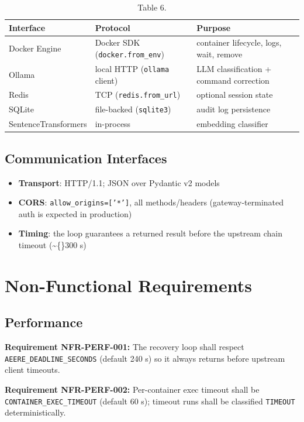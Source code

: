 \documentclass[10pt,journal,onecolumn]{IEEEtran}
\newcommand{\reqid}[1]{\textbf{#1}}
\begin{document}
\begin{table}[h]
\caption{Table 6.}
\label{tab:t6}
\begin{tabularx}{\columnwidth}{l >{\raggedright\arraybackslash}X >{\raggedright\arraybackslash}X}
\toprule
\textbf{Interface} & \textbf{Protocol} & \textbf{Purpose}\\
\midrule
Docker Engine & Docker SDK (\texttt{docker.from\_env}) & container lifecycle, logs, wait, remove\\
Ollama & local HTTP (\texttt{ollama} client) & LLM classification + command correction\\
Redis & TCP (\texttt{redis.from\_url}) & optional session state\\
SQLite & file-backed (\texttt{sqlite3}) & audit log persistence\\
SentenceTransformers & in-process & embedding classifier\\
\bottomrule
\end{tabularx}
\end{table}

\subsection{Communication Interfaces}

\begin{itemize}
\item \textbf{Transport}: HTTP/1.1; JSON over Pydantic v2 models
\item \textbf{CORS}: \texttt{allow\_origins=['*']}, all methods/headers (gateway-terminated auth is expected in production)
\item \textbf{Timing}: the loop guarantees a returned result before the upstream chain timeout (\textasciitilde\{\}300 s)
\end{itemize}

\section{Non-Functional Requirements}

\subsection{Performance}

\reqid{Requirement NFR-PERF-001:} The recovery loop shall respect \texttt{AEERE\_DEADLINE\_SECONDS} (default 240 s) so it always returns before upstream client timeouts.

\reqid{Requirement NFR-PERF-002:} Per-container exec timeout shall be \texttt{CONTAINER\_EXEC\_TIMEOUT} (default 60 s); timeout runs shall be classified \texttt{TIMEOUT} deterministically.
\end{document}
